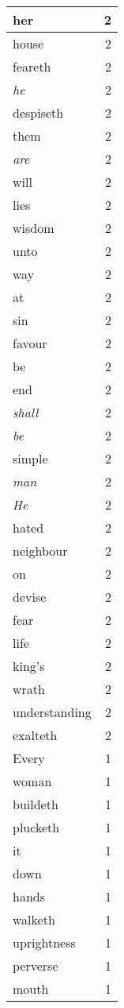 \begin{center}
\begin{longtable}{l|r}
her & 2\\ \hline 
house & 2\\ \hline 
feareth & 2\\ \hline 
\emph{he} & 2\\ \hline 
despiseth & 2\\ \hline 
them & 2\\ \hline 
\emph{are} & 2\\ \hline 
will & 2\\ \hline 
lies & 2\\ \hline 
wisdom & 2\\ \hline 
unto & 2\\ \hline 
way & 2\\ \hline 
at & 2\\ \hline 
sin & 2\\ \hline 
favour & 2\\ \hline 
be & 2\\ \hline 
end & 2\\ \hline 
\emph{shall} & 2\\ \hline 
\emph{be} & 2\\ \hline 
simple & 2\\ \hline 
\emph{man} & 2\\ \hline 
\emph{He} & 2\\ \hline 
hated & 2\\ \hline 
neighbour & 2\\ \hline 
on & 2\\ \hline 
devise & 2\\ \hline 
fear & 2\\ \hline 
life & 2\\ \hline 
king's & 2\\ \hline 
wrath & 2\\ \hline 
understanding & 2\\ \hline 
exalteth & 2\\ \hline 
Every & 1\\ \hline 
woman & 1\\ \hline 
buildeth & 1\\ \hline 
plucketh & 1\\ \hline 
it & 1\\ \hline 
down & 1\\ \hline 
hands & 1\\ \hline 
walketh & 1\\ \hline 
uprightness & 1\\ \hline 
perverse & 1\\ \hline 
mouth & 1\\ \hline 

\end{longtable}
\end{center}
